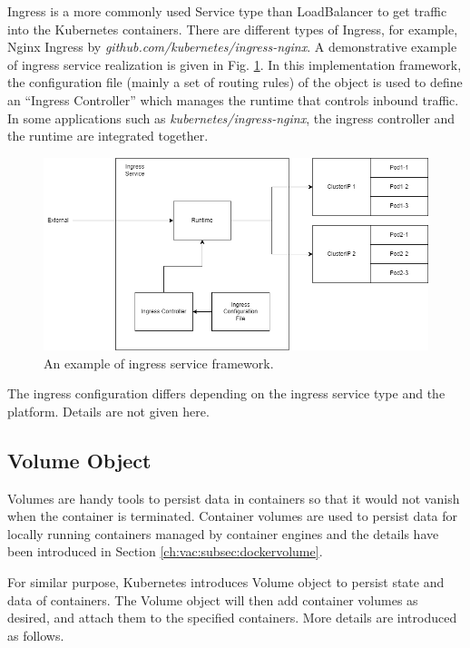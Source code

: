 Ingress is a more commonly used Service type than LoadBalancer to get traffic into the Kubernetes containers. There are different types of Ingress, for example, Nginx Ingress by \textit{github.com/kubernetes/ingress-nginx}. A demonstrative example of ingress service realization is given in Fig. \ref{ch:vac:fig:ingress_service}. In this implementation framework, the configuration file (mainly a set of routing rules) of the object is used to define an ``Ingress Controller'' which manages the runtime that controls inbound traffic. In some applications such as \textit{kubernetes/ingress-nginx}, the ingress controller and the runtime are integrated together.

\begin{figure}[htbp]
	\centering
	\includegraphics[width=350pt]{chapters/part-3/figures/ingress_service.png}
	\caption{An example of ingress service framework.} \label{ch:vac:fig:ingress_service}
\end{figure}

The ingress configuration differs depending on the ingress service type and the platform. Details are not given here.

\subsection{Volume Object} \label{ch:vac:subsec:k8svolume}

Volumes are handy tools to persist data in containers so that it would not vanish when the container is terminated. Container volumes are used to persist data for locally running containers managed by container engines and the details have been introduced in Section \ref{ch:vac:subsec:dockervolume}.

For similar purpose, Kubernetes introduces Volume object to persist state and data of containers. The Volume object will then add container volumes as desired, and attach them to the specified containers. More details are introduced as follows.

